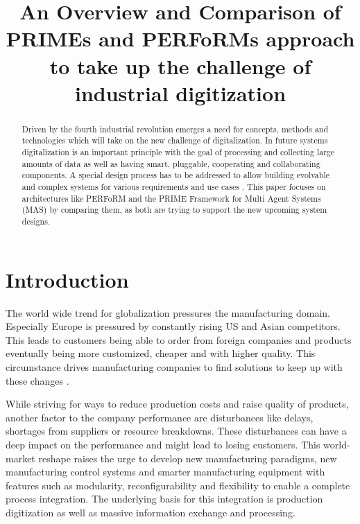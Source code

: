 \documentclass[conference,compsoc,hidelinks]{IEEEtran}
\begin{document}
\title{An Overview and Comparison of PRIMEs and PERFoRMs approach to take up the challenge of industrial digitization}

\author{
}

\maketitle

\begin{abstract}
Driven by the fourth industrial revolution emerges a need for concepts, methods and technologies which will take on the new challenge of digitalization. In future systems digitalization is an important principle with the goal of processing and collecting large amounts of data as well as having smart, pluggable, cooperating and collaborating components. A special design process has to be addressed to allow building evolvable and complex systems for various requirements and use cases \cite{Peres2017}. This paper focuses on architectures like PERFoRM and the PRIME Framework for Multi Agent Systems (MAS) by comparing them, as both are trying to support the new upcoming system designs.
\end{abstract}

\section{Introduction} %
The world wide trend for globalization pressures the manufacturing domain. Especially Europe is pressured by constantly rising US and Asian competitors. This leads to customers being able to order from foreign companies and products eventually being more customized, cheaper and with higher quality. This circumstance drives manufacturing companies to find solutions to keep up with these changes \cite{HarmonizedSystems}. 

While striving for ways to reduce production costs and raise quality of products, another factor to the company performance are disturbances like delays, shortages from suppliers or resource breakdowns. These disturbances can have a deep impact on the performance and might lead to losing customers. This world-market reshape raises the urge to develop new manufacturing paradigms, new manufacturing control systems and smarter manufacturing equipment with features such as modularity, reconfigurability and flexibility \cite{SCHEIFELE2014398} to enable a complete process integration. The underlying basis for this integration is production digitization as well as massive information exchange and processing. 
\end{document}
